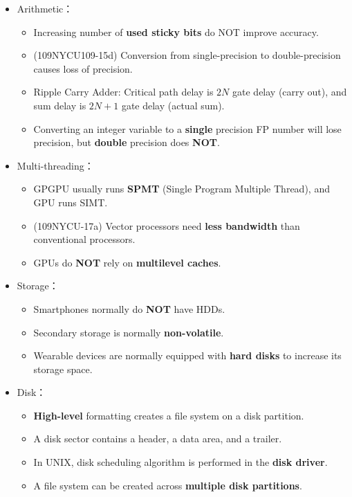 \begin{itemize}
\begin{itemize}
    \end{itemize}
    \item Arithmetic： \begin{itemize}
        \item Increasing number of \textbf{used sticky bits} do NOT improve accuracy.
        \item (109NYCU109-15d) Conversion from single-precision to double-precision causes loss of precision.
        \item Ripple Carry Adder: Critical path delay is $2N$ gate delay (carry out), and sum delay is $2N + 1$ gate delay (actual sum).
        \item Converting an integer variable to a \textbf{single} precision FP number will lose precision, but \textbf{double} precision does \textbf{NOT}.
    \end{itemize}
    \item Multi-threading： \begin{itemize}
        \item GPGPU usually runs \textbf{SPMT} (Single Program Multiple Thread), and GPU runs SIMT.
        \item (109NYCU-17a) Vector processors need \textbf{less bandwidth} than conventional processors.
        \item GPUs do \textbf{NOT} rely on \textbf{multilevel caches}.
    \end{itemize}
    \item Storage： \begin{itemize}
        \item Smartphones normally do \textbf{NOT} have HDDs.
        \item Secondary storage is normally \textbf{non-volatile}.
        \item Wearable devices are normally equipped with \textbf{hard disks} to increase its storage space.
    \end{itemize}
    \item Disk： \begin{itemize}
        \item \textbf{High-level} formatting creates a file system on a disk partition.
        \item A disk sector contains a header, a data area, and a trailer.
        \item In UNIX, disk scheduling algorithm is performed in the \textbf{disk driver}.
        \item A file system can be created across \textbf{multiple disk partitions}.

\end{itemize}
\end{itemize}
